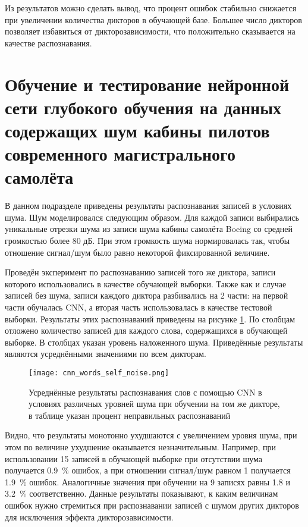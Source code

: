 Из результатов можно сделать вывод, что процент ошибок стабильно снижается при увеличении количества дикторов в обучающей базе.
Большее число дикторов позволяет избавиться от дикторозависимости, что положительно сказывается на качестве распознавания.

\clearpage


\section{Обучение и тестирование нейронной сети глубокого обучения на данных содержащих шум кабины пилотов современного магистрального самолёта} \label{sect4_4}

В данном подразделе приведены результаты распознавания записей в условиях шума.
Шум моделировался следующим образом.
Для каждой записи выбирались уникальные отрезки шума из записи шума кабины самолёта Boeing со средней громкостью более 80 дБ.
При этом громкость шума нормировалась так, чтобы отношение сигнал/шум было равно некоторой фиксированной величине.

Проведён эксперимент по распознаванию записей того же диктора, записи которого использовались в качестве обучающей выборки.
Также как и случае записей без шума, записи каждого диктора разбивались на 2 части: на первой части обучалась CNN, а вторая часть использовалась в качестве тестовой выборки.
Результаты этих распознаваний приведены на рисунке \ref{fig:cnn_words_self_noise}.
По столбцам отложено количество записей для каждого слова, содержащихся в обучающей выборке.
В столбцах указан уровень наложенного шума.
Приведённые результаты являются усреднёнными значениями по всем дикторам.

\begin{figure}[h]
	\centering
	\texttt{[image: cnn\_words\_self\_noise.png]}
	\caption{Усреднённые результаты распознавания слов с помощью CNN в условиях различных уровней шума при обучении на том же дикторе, в таблице указан процент неправильных распознаваний}
	\label{fig:cnn_words_self_noise}
\end{figure}

Видно, что результаты монотонно ухудшаются с увеличением уровня шума, при этом по величине ухудшение оказывается незначительным.
Например, при использовании 15 записей в обучающей выборке при отсутствии шума получается 0.9~\% ошибок, а при отношении сигнал/шум равном 1 получается 1.9~\% ошибок.
Аналогичные значения при обучении на 9 записях равны 1.8 и 3.2~\% соответственно.
Данные результаты показывают, к каким величинам ошибок нужно стремиться при распознавании записей с шумом других дикторов для исключения эффекта дикторозависимости.


